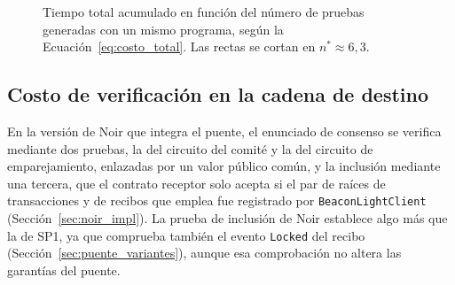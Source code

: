 \begin{figure}[htbp]
	\centering
	\caption[Tiempo total acumulado en función del número de pruebas.]{Tiempo total acumulado en
	función del número de pruebas generadas con un mismo programa, según la
	Ecuación~\eqref{eq:costo_total}. Las rectas se cortan en $n^{*} \approx 6{,}3$.}
	\label{fig:resultados_equilibrio}
\end{figure}

\subsection{Costo de verificación en la cadena de destino}
\label{sec:resultados_gas}

En la versión de Noir que integra el puente, el enunciado de consenso se verifica mediante dos
pruebas, la del circuito del comité y la del circuito de emparejamiento, enlazadas por un valor
público común, y la inclusión mediante una tercera, que el contrato receptor solo acepta si el par
de raíces de transacciones y de recibos que emplea fue registrado por \texttt{BeaconLightClient}
(Sección~\ref{sec:noir_impl}). La prueba de inclusión de Noir establece algo más que la de SP1,
ya que comprueba también el evento \texttt{Locked} del recibo
(Sección~\ref{sec:puente_variantes}), aunque esa comprobación no altera las garantías del puente.

